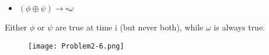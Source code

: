 \subsection{}

\begin{itemize}
   \item[] $(\phi \oplus \psi) \rightarrow \square \omega$ 
\end{itemize}

\noindent Either $\phi$ or $\psi$ are true at time i (but never both), while $\omega$ is always true.

\begin{figure}[h!]
	\centering \texttt{[image: Problem2-6.png]}
\end{figure}